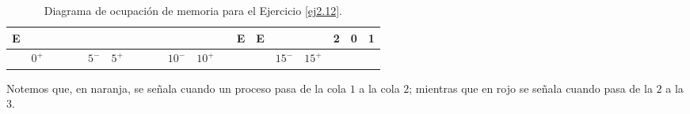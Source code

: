 \begin{ejercicio}
\begin{table}[H]
\begin{tabular}{ccccccccccccccccc|ccc}
        \multicolumn{1}{c|}{\textbf{E}} &                        &                                &                                &                                &                          &                        &                                &                                &                                &                          &                         &                                & E                              & {\color[HTML]{F56B00} E}       &                         &    & 2          & 0          & 1          \\ \hline
        \multicolumn{1}{c|}{}           & \multicolumn{1}{c|}{$0^+$} & \multicolumn{1}{c|}{\textit{}} & \multicolumn{1}{c|}{\textit{}} & \multicolumn{1}{c|}{\textit{}} & \multicolumn{1}{c|}{$5^-$} & \multicolumn{1}{c|}{$5^+$} & \multicolumn{1}{c|}{\textit{}} & \multicolumn{1}{c|}{\textit{}} & \multicolumn{1}{c|}{\textit{}} & \multicolumn{1}{c|}{$10^-$} & \multicolumn{1}{c|}{$10^+$} & \multicolumn{1}{c|}{\textit{}} & \multicolumn{1}{c|}{\textit{}} & \multicolumn{1}{c|}{\textit{}} & \multicolumn{1}{c|}{$15^-$} & $15^+$ &            &            &           
        \end{tabular}
        \caption{Diagrama de ocupación de memoria para el Ejercicio \ref{ej2.12}.}
    \end{table}

    Notemos que, en naranja, se señala cuando un proceso pasa de la cola $1$ a la cola $2$; mientras que en rojo se señala cuando pasa de la $2$ a la $3$.
\end{ejercicio}